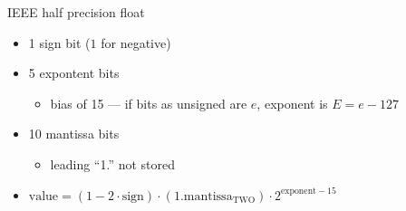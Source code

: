 \begin{frame}{IEEE half precision float}
\begin{itemize}
\item 1 sign bit ($1$ for negative)
\item 5 expontent bits
    \begin{itemize}
    \item bias of 15 --- if bits as unsigned are $e$, exponent is $E=e-127$
    \end{itemize}
\item 10 mantissa bits
    \begin{itemize}
    \item leading ``1.'' not stored
    \end{itemize}
\vspace{.5cm}
\item $\text{value} = (1-2\cdot \text{sign}) \cdot (1.\text{mantissa}_\text{TWO}) \cdot 2^{\text{exponent}-15}$
\end{itemize}
\end{frame}

